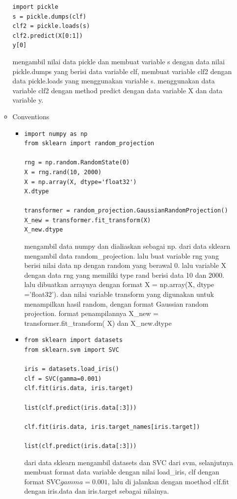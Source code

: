 \begin{enumerate}
\begin{itemize}
\begin{verbatim}
import pickle
s = pickle.dumps(clf)
clf2 = pickle.loads(s)
clf2.predict(X[0:1])
y[0]
\end{verbatim}
\subitem
mengambil nilai data pickle dan membuat variable s dengan data nilai pickle.dumps yang berisi data variable clf, membuat variable clf2 dengan data pickle.loads yang menggunakan variable s. menggunakan data variable clf2 dengan method predict dengan data variable X dan data variable y.

\item
Conventions
\begin{itemize}
\item
\begin{verbatim}
import numpy as np
from sklearn import random_projection

rng = np.random.RandomState(0)
X = rng.rand(10, 2000)
X = np.array(X, dtype='float32')
X.dtype

transformer = random_projection.GaussianRandomProjection()
X_new = transformer.fit_transform(X)
X_new.dtype
\end{verbatim}
\subitem
mengambil data numpy dan dialiaskan sebagai np. dari data sklearn mengambil data random\_projection. lalu buat variable rng yang berisi nilai data np dengan random yang berawal 0. lalu variable X dengan data rng yang memiliki type rand berisi data 10 dan 2000. lalu dibuatkan arraynya dengan format X = np.array(X, dtype ='float32'). dan nilai variable transform yang digunakan untuk menampilkan hasil random, dengan format Gaussian random projection. format penampilannya X\_new = transformer.fit\_transform( X) dan X\_new.dtype

\item
\begin{verbatim}
from sklearn import datasets
from sklearn.svm import SVC

iris = datasets.load_iris()
clf = SVC(gamma=0.001)
clf.fit(iris.data, iris.target)

list(clf.predict(iris.data[:3]))

clf.fit(iris.data, iris.target_names[iris.target])

list(clf.predict(iris.data[:3])) 
\end{verbatim}
\subitem
dari data sklearn mengambil datasets dan SVC dari svm, selanjutnya membuat format data variable dengan nilai load\_iris\(\), clf dengan format SVC\(gamma=0.001\), lalu di jalankan dengan moethod clf.fit dengan iris.data dan iris.target sebagai nilainya.


\end{itemize}
\end{itemize}
\end{enumerate}
